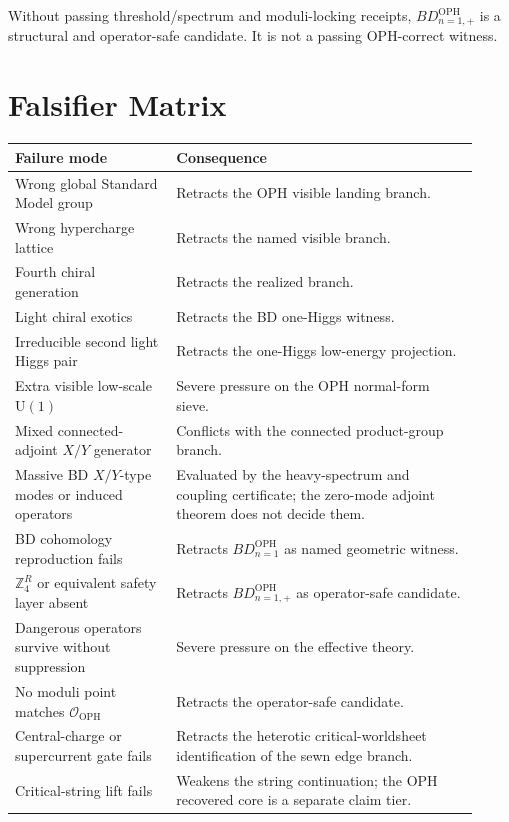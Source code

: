 \documentclass[11pt]{article}
\theoremstyle{remark}
\theoremstyle{plain}
\newcommand{\OPH}{\mathrm{OPH}}
\newcommand{\U}{\mathrm{U}}
\newcommand{\calO}{\mathcal O}
\newcommand{\ZfourR}{\mathbb Z_4^R}
\begin{document}
Without passing threshold/spectrum and moduli-locking receipts,
\(BD_{n=1,+}^{\OPH}\) is a structural and operator-safe candidate. It is not a passing
OPH-correct witness.

\section{Falsifier Matrix}

\begin{longtable}{p{0.32\linewidth}p{0.60\linewidth}}
\toprule
\textbf{Failure mode} & \textbf{Consequence} \\
\midrule
Wrong global Standard Model group & Retracts the OPH visible landing branch. \\
Wrong hypercharge lattice & Retracts the named visible branch. \\
Fourth chiral generation & Retracts the realized branch. \\
Light chiral exotics & Retracts the BD one-Higgs witness. \\
Irreducible second light Higgs pair & Retracts the one-Higgs low-energy projection. \\
Extra visible low-scale \(\U(1)\) & Severe pressure on the OPH normal-form sieve. \\
Mixed connected-adjoint \(X/Y\) generator & Conflicts with the connected product-group branch. \\
Massive BD \(X/Y\)-type modes or induced operators & Evaluated by the heavy-spectrum and
coupling certificate; the zero-mode adjoint theorem does not decide them. \\
BD cohomology reproduction fails & Retracts \(BD_{n=1}^{\OPH}\) as named geometric witness. \\
\(\ZfourR\) or equivalent safety layer absent & Retracts \(BD_{n=1,+}^{\OPH}\) as
operator-safe candidate. \\
Dangerous operators survive without suppression & Severe pressure on the effective theory. \\
No moduli point matches \(\calO_{\OPH}\) & Retracts the operator-safe candidate. \\
Central-charge or supercurrent gate fails & Retracts the heterotic critical-worldsheet
identification of the sewn edge branch. \\
Critical-string lift fails & Weakens the string continuation; the OPH recovered core is a separate claim tier. \\
\bottomrule
\end{longtable}
\end{document}
